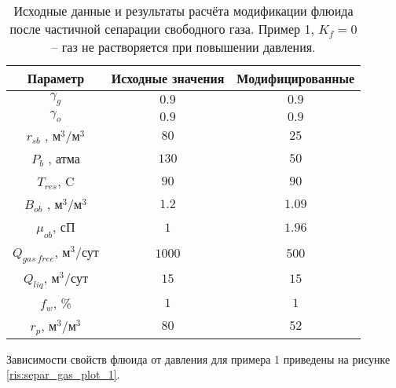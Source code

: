 \begin{table}[ht]
	\centering
	\caption{Исходные данные и результаты расчёта модификации флюида после частичной сепарации свободного газа. Пример 1, $K_f=0$ -- газ не растворяется при повышении давления.}
	\begin{tabular}{ |c|c|c|} 
		\hline
		Параметр & Исходные значения & Модифицированные \\ 
		\hline
		$\gamma_g$ 				&$0.9$	& $0.9$    \\ 
		$\gamma_o$ 					&$0.9$	& $0.9$   \\ 
		$r_{sb}$ ,  м$^3$/м$^3$ 		&$80$	& $25$ \\ 
		$P_b$ , атма 					&$130$	& $50$ 	 \\ 
		$T_{res} $,  C 					&$90$	& $90$ \\ 
		$B_{ob} $ , м$^3$/м$^3$  		&$1.2$	& $1.09$ \\ 
		$\mu_{ob}  $,  сП  				&$1$	& $1.96$   \\ 
		\hline
		$Q_{gas\ free}  $,  м$^3$/сут  	&$1000$	& $500$  \\ 
		$Q_{liq}  $,  м$^3$/сут  			&$15$	& $15$ \\ 
		$f_{w}  $,  \%  					&$1$	& $1$  \\ 
		$r_p  $,  м$^3$/м$^3$  			&$80$	& $52$ \\ 
		\hline
	\end{tabular}
	\label{table:separ_gas_table_1}
\end{table}

Зависимости свойств флюида от давления для примера 1 приведены на рисунке \ref{ris:separ_gas_plot_1}.

